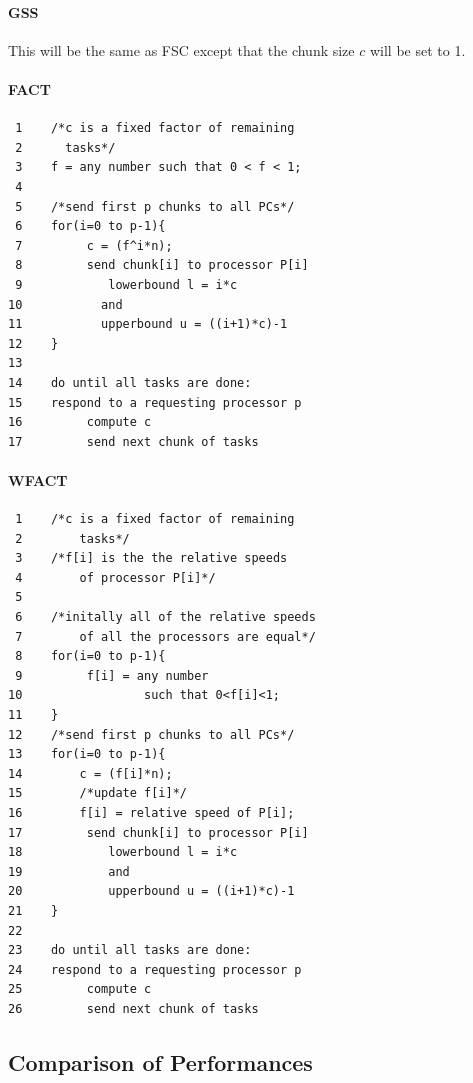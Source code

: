 \documentclass[10pt, twocolumn, letterpaper]{article}
\begin{document}
\paragraph{\textsf{GSS}}
This will be the same as FSC except that the chunk size $c$ will be set to 1.\\

\paragraph{\textsf{FACT}}
\begin{verbatim}
 1    /*c is a fixed factor of remaining
 2      tasks*/
 3    f = any number such that 0 < f < 1;
 4
 5    /*send first p chunks to all PCs*/
 6    for(i=0 to p-1){
 7         c = (f^i*n);
 8         send chunk[i] to processor P[i]
 9            lowerbound l = i*c
10           and
11           upperbound u = ((i+1)*c)-1
12    }
13
14    do until all tasks are done:
15    respond to a requesting processor p
16         compute c
17         send next chunk of tasks
\end{verbatim}

\paragraph{\textsf{WFACT}}
\begin{verbatim}
 1    /*c is a fixed factor of remaining
 2        tasks*/
 3    /*f[i] is the the relative speeds
 4        of processor P[i]*/
 5
 6    /*initally all of the relative speeds
 7        of all the processors are equal*/
 8    for(i=0 to p-1){
 9         f[i] = any number
10                 such that 0<f[i]<1;
11    } 
12    /*send first p chunks to all PCs*/
13    for(i=0 to p-1){
14        c = (f[i]*n);
15        /*update f[i]*/
16        f[i] = relative speed of P[i];
17         send chunk[i] to processor P[i]
18            lowerbound l = i*c
19            and
20            upperbound u = ((i+1)*c)-1
21    }
22
23    do until all tasks are done:
24    respond to a requesting processor p
25         compute c
26         send next chunk of tasks
\end{verbatim}

\subsection{Comparison of Performances}
\end{document}
